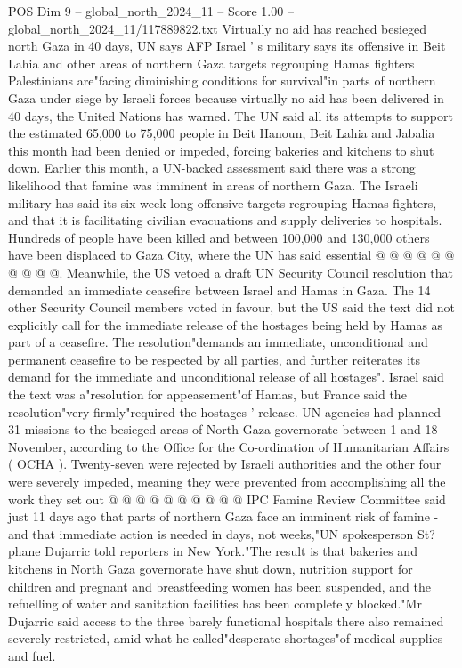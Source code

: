 \begin{textsample}{POS Dim 9 – global\_north\_2024\_11 – Score 1.00 – global\_north\_2024\_11/117889822.txt}  \label{ex:f9_pos_404}
Virtually no aid has reached besieged north Gaza in 40 days, UN says AFP Israel ' s military says its offensive in Beit Lahia and other areas of northern Gaza targets regrouping Hamas fighters Palestinians are"facing diminishing conditions for survival"in parts of northern Gaza under siege by Israeli forces because virtually no aid has been delivered in 40 days, the United Nations has warned.
The UN said all its attempts to support the estimated 65,000 to 75,000 people in Beit Hanoun, Beit Lahia and Jabalia this month had been denied or impeded, forcing bakeries and kitchens to shut down.
Earlier this month, a UN-backed assessment said there was a strong likelihood that famine was imminent in areas of northern Gaza.
The Israeli military has said its six-week-long offensive targets regrouping Hamas fighters, and that it is facilitating civilian evacuations and supply deliveries to hospitals.
Hundreds of people have been killed and between 100,000 and 130,000 others have been displaced to Gaza City, where the UN has said essential @ @ @ @ @ @ @ @ @ @.
Meanwhile, the US vetoed a draft UN Security Council resolution that demanded an immediate ceasefire between Israel and Hamas in Gaza.
The 14 other Security Council members voted in favour, but the US said the text did not explicitly call for the immediate release of the hostages being held by Hamas as part of a ceasefire.
The resolution"demands an immediate, unconditional and permanent ceasefire to be respected by all parties, and further reiterates its demand for the immediate and unconditional release of all hostages".
Israel said the text was a"resolution for appeasement"of Hamas, but France said the resolution"very firmly"required the hostages ' release.
UN agencies had planned 31 missions to the besieged areas of North Gaza governorate between 1 and 18 November, according to the Office for the Co-ordination of Humanitarian Affairs ( OCHA ).
Twenty-seven were rejected by Israeli authorities and the other four were severely impeded, meaning they were prevented from accomplishing all the work they set out @ @ @ @ @ @ @ @ @ @ IPC Famine Review Committee said just 11 days ago that parts of northern Gaza face an imminent risk of famine - and that immediate action is needed in days, not weeks,"UN spokesperson St? phane Dujarric told reporters in New York."The result is that bakeries and kitchens in North Gaza governorate have shut down, nutrition support for children and pregnant and breastfeeding women has been suspended, and the refuelling of water and sanitation facilities has been completely blocked."Mr Dujarric said access to the three barely functional hospitals there also remained severely restricted, amid what he called"desperate shortages"of medical supplies and fuel.

\end{textsample}
